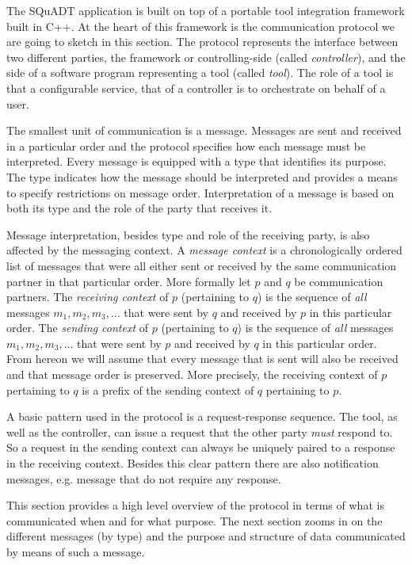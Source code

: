 \documentclass{article}
\newcommand{\squadt}{SQuADT\xspace}
\begin{document}
  The \squadt application is built on top of a portable tool integration
  framework built in C++. At the heart of this framework is the communication
  protocol we are going to sketch in this section. The protocol represents the
  interface between two different parties, the framework or controlling-side
  (called \textit{controller}), and the side of a software program representing
  a tool (called \textit{tool}). The role of a tool is that a configurable
  service, that of a controller is to orchestrate on behalf of a user.

  The smallest unit of communication is a message. Messages are sent and
  received in a particular order and the protocol specifies how each message
  must be interpreted. Every message is equipped with a type that identifies
  its purpose.  The type indicates how the message should be interpreted and
  provides a means to specify restrictions on message order. Interpretation of
  a message is based on both its type and the role of the party that receives
  it.

  Message interpretation, besides type and role of the receiving party, is also
  affected by the messaging context.  A \textit{message context} is a
  chronologically ordered list of messages that were all either sent or
  received by the same communication partner in that particular order.  More
  formally let $p$ and $q$ be communication partners. The \textit{receiving
  context} of $p$ (pertaining to $q$) is the sequence of \emph{all} messages
  $m_{1}, m_{2}, m_{3}, \ldots$ that were sent by $q$ and received by $p$ in
  this particular order.  The \textit{sending context} of $p$ (pertaining to
  $q$) is the sequence of \emph{all} messages $m_{1}, m_{2}, m_{3}, \ldots$
  that were sent by $p$ and received by $q$ in this particular order. From
  hereon we will assume that every message that is sent will also be received
  and that message order is preserved. More precisely, the receiving context of
  $p$ pertaining to $q$ is a prefix of the sending context of $q$ pertaining to
  $p$.

  A basic pattern used in the protocol is a request-response sequence. The
  tool, as well as the controller, can issue a request that the other party
  \emph{must} respond to. So a request in the sending context can always be
  uniquely paired to a response in the receiving context. Besides this clear
  pattern there are also notification messages, e.g. message that do not
  require any response.

  This section provides a high level overview of the protocol in terms of what
  is communicated when and for what purpose. The next section zooms in on the
  different messages (by type) and the purpose and structure of data
  communicated by means of such a message.
\end{document}
